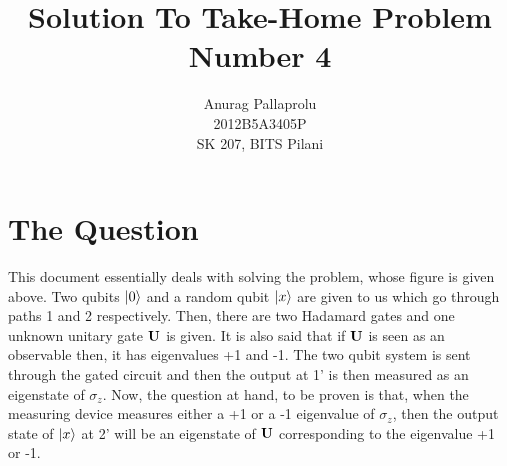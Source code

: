 

\title{Solution To Take-Home Problem Number 4}
\author{Anurag Pallaprolu\\2012B5A3405P\\SK 207, BITS Pilani}
\maketitle
\section{The Question}
This document essentially deals with solving the problem, whose figure is given above. Two qubits $\left| 0 \right>$ and a random qubit $\left| x \right>$ are given to us which go through paths 1 and 2 respectively. Then, there are two Hadamard gates and one unknown unitary gate $\mathbf{U}$ is given. It is also said that if $\mathbf{U}$ is seen as an observable then, it has eigenvalues +1 and -1.  The two qubit system is sent through the gated circuit and then the output at 1' is then measured as an eigenstate of $\sigma_{z}$. Now, the question at hand, to be proven is that, when the measuring device measures either a +1 or a -1 eigenvalue of  $\sigma_{z}$, then the output state of $\left| x \right>$ at 2' will be an eigenstate of $\mathbf{U}$ corresponding to the eigenvalue +1 or -1.

